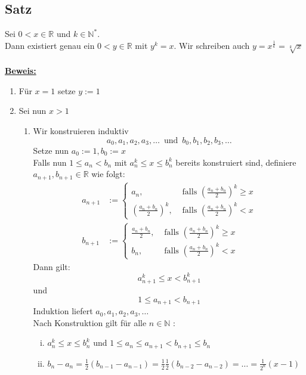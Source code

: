 \subsection{Satz} %
\label{sub:satz}
Sei $ 0 < x \in \mathds{R}$ und $k \in \mathds{N}^*$. \\
Dann existiert genau ein $ 0< y \in \mathds{R}$ mit $ y^k = x$. Wir schreiben auch $y= x^{\frac{1}{k}} = \sqrt[k]{x}$ \\
\vspace{\baselineskip} \\
\underline{\textbf{Beweis:}} \\
\begin{enumerate}
	\item Für $x=1$ setze $y:= 1$
	\item Sei nun $x>1$
	\begin{enumerate}[ \bfseries{} B.1]
		\item Wir konstruieren induktiv
		\[
			a_0 , a_1 , a_2 , a_3 , \ldots \enspace \text{und} \enspace b_0 , b_1 , b_2, b_3, \ldots 
		\]
		Setze nun $a_0 := 1 , b_0 := x$\\
		Falls nun $ 1 \leq a_n < b_n$ mit $a_n^k \leq x \leq b_n^k$ bereits konstruiert sind, 
		definiere $a_{n+1}, b_{n+1} \in \mathds{R}$ wie folgt:
		\begin{align*}
			a_{n+1} &:= \begin{cases}
				a_n, &\text{ falls }(\frac{a_n + b_n}{2})^k \geq x\\
				(\frac{a_n + b_n}{2})^k , &\text{ falls } (\frac{a_n + b_n}{2})^k < x
			\end{cases} \\
			b_{n+1} &:= \begin{cases}
				\frac{a_n + b_n}{2}, &\text{ falls } (\frac{a_n + b_n}{2})^k \geq x\\
				b_n , &\text{ falls } (\frac{a_n + b_n}{2})^k < x
			\end{cases}
		\end{align*}
		Dann gilt: 
		\[
			a_{n+1}^k \leq x < b_{n+1}^k
		\]
		und 
		\[
			1 \leq a_{n+1} < b_{n+1}
		\]
		Induktion liefert $a_0 , a_1 , a_2 , a_3 , \ldots $ \\
		Nach Konstruktion gilt für alle $n \in \mathds{N} $ :
		\begin{enumerate}[(i)]
			\item $a_n^k \leq x \leq b_n^k$ und $1 \leq a_n \leq a_{n+1} < b_{n+1} \leq b_n$
			\item $b_n - a_n = \frac{1}{2} (b_{n-1} - a_{n-1}) = \frac{1}{2} \frac{1}{2} (b_{n-2} -a_{n-2}) = \ldots = \frac{1}{2^n} (x-1)$

\end{enumerate}
\end{enumerate}
\end{enumerate}
